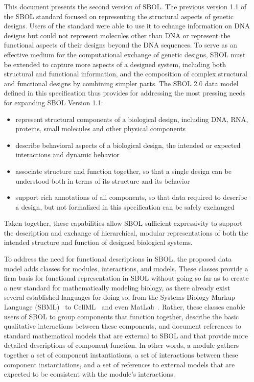 This document presents the second version of SBOL.
The previous version 1.1 of the SBOL standard focused on representing the structural aspects of genetic designs. 
Users of the standard were able to use it to echange information on DNA designs but could not represent molecules other than DNA or represent the functional aspects of their designs beyond the DNA sequences. 
To serve as an effective medium for the computational exchange of genetic designs, SBOL must be extended to capture more aspects of a designed system, including both structural and functional information, and the composition of complex structural and functional designs by combining simpler parts. The SBOL 2.0 data model defined in this specification thus provides for addressing the most pressing needs for expanding SBOL Version 1.1:

\begin{itemize}

\item represent structural components of a biological design, including DNA, RNA, proteins, small molecules and other physical components

\item describe behavioral aspects of a biological design, the intended or expected interactions and dynamic behavior

\item associate structure and function together, so that a single design can be understood both in terms of its structure and its behavior

\item support rich annotations of all components, so that data required to describe a design, but not formalized in this specification can be safely exchanged

\end{itemize}

Taken together, these capabilities allow SBOL sufficient expressivity to support the description and exchange of hierarchical, modular representations of both the intended structure and function of designed biological systems.

To address the need for functional descriptions in SBOL, the proposed data model adds classes for modules, interactions, and models. These classes provide a firm basis for functional representation in SBOL without going so far as to create a new standard for mathematically modeling biology, as there already exist several established languages for doing so, from the Systems Biology Markup Language (SBML)~\cite{SBML} to CellML~\cite{CellML} and even MatLab~\cite{matlab}. Rather, these classes enable users of SBOL to group components that function together, describe the basic qualitative interactions between these components, and document references to standard mathematical models that are external to SBOL and that provide more detailed descriptions of component function. In other words, a module gathers together a set of component instantiations, a set of interactions between these component instantiations, and a set of references to external models that are expected to be consistent with the module's interactions.

